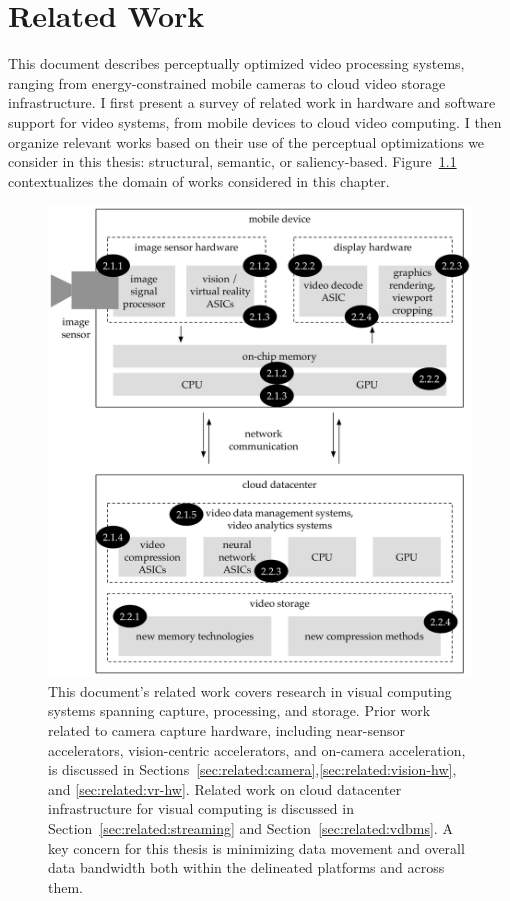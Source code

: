 \chapter{Related Work}\label{ch:related}

This document describes perceptually optimized video processing systems, ranging from energy-constrained mobile cameras to cloud video storage infrastructure. I first present a survey of related work in hardware and software support for video systems, from mobile devices to cloud video computing. I then organize relevant works based on their use of the perceptual optimizations we consider in this thesis: structural, semantic, or saliency-based. Figure~\ref{fig:related-work} contextualizes the domain of works considered in this chapter.

\begin{figure}[h]
\centering
    \begin{center}
\includegraphics[width=.7\textwidth]{hfbs-figs/related-work.pdf}
    \end{center}
    \caption{This document's related work covers research in visual computing systems spanning capture, processing, and storage. Prior work related to camera capture hardware, including near-sensor accelerators, vision-centric accelerators, and on-camera acceleration, is discussed in Sections~\ref{sec:related:camera},\ref{sec:related:vision-hw}, and \ref{sec:related:vr-hw}. Related work on cloud datacenter infrastructure for visual computing is discussed in Section~\ref{sec:related:streaming} and Section~\ref{sec:related:vdbms}. A key concern for this thesis is minimizing data movement and overall data bandwidth both within the delineated platforms and across them.}
    \label{fig:related-work}
\end{figure}


